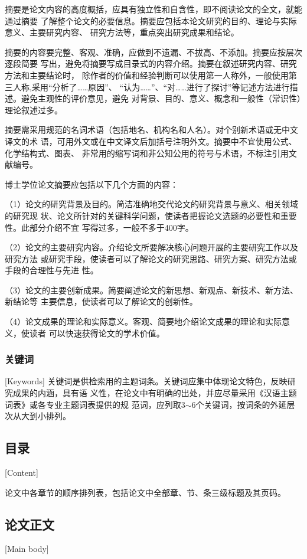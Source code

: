 摘要是论文内容的高度概括，应具有独立性和自含性，即不阅读论文的全文，就能通过摘要
了解整个论文的必要信息。摘要应包括本论文研究的目的、理论与实际意义、主要研究内容、
研究方法等，重点突出研究成果和结论。

摘要的内容要完整、客观、准确，应做到不遗漏、不拔高、不添加。摘要应按层次逐段简要
写出，避免将摘要写成目录式的内容介绍。摘要在叙述研究内容、研究方法和主要结论时，
除作者的价值和经验判断可以使用第一人称外，一般使用第三人称,采用“分析了……原因”、
“认为……”、“对……进行了探讨”等记述方法进行描述。避免主观性的评价意见，避免
对背景、目的、意义、概念和一般性（常识性）理论叙述过多。

摘要需采用规范的名词术语（包括地名、机构名和人名）。对个别新术语或无中文译文的术
语，可用外文或在中文译文后加括号注明外文。摘要中不宜使用公式、化学结构式、图表、
非常用的缩写词和非公知公用的符号与术语，不标注引用文献编号。

博士学位论文摘要应包括以下几个方面的内容：

（1）论文的研究背景及目的。简洁准确地交代论文的研究背景与意义、相关领域的研究现
状、论文所针对的关键科学问题，使读者把握论文选题的必要性和重要性。此部分介绍不宜
写得过多，一般不多于400字。

（2）论文的主要研究内容。介绍论文所要解决核心问题开展的主要研究工作以及研究方法
或研究手段，使读者可以了解论文的研究思路、研究方案、研究方法或手段的合理性与先进
性。

（3）论文的主要创新成果。简要阐述论文的新思想、新观点、新技术、新方法、新结论等
主要信息，使读者可以了解论文的创新性。

（4）论文成果的理论和实际意义。客观、简要地介绍论文成果的理论和实际意义，使读者
可以快速获得论文的学术价值。

\subsubsection{关键词}[Keywords]
关键词是供检索用的主题词条。关键词应集中体现论文特色，反映研究成果的内涵，具有语
义性，在论文中有明确的出处，并应尽量采用《汉语主题词表》或各专业主题词表提供的规
范词，应列取3$\sim$6个关键词，按词条的外延层次从大到小排列。

\subsection{目录}[Content]

论文中各章节的顺序排列表，包括论文中全部章、节、条三级标题及其页码。

\subsection{论文正文}[Main body]

